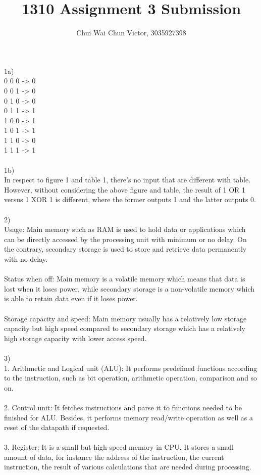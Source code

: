 \documentclass{article}
\title{1310 Assignment 3 Submission}
\author{Chui Wai Chun Victor, 3035927398}
\begin{document}
\maketitle
\noindent
1a) \\
0 0 0 -> 0\\
0 0 1 -> 0\\
0 1 0 -> 0\\
0 1 1 -> 1\\
1 0 0 -> 1\\
1 0 1 -> 1\\
1 1 0 -> 0\\
1 1 1 -> 1\\\\
1b)\\
In respect to figure 1 and table 1, there's no input that are different with table. However, without considering the above figure and table, the result of 1 OR 1 versus 1 XOR 1 is different, where the former outputs 1 and the latter outputs 0.\\
\\
2)\\
Usage: Main memory such as RAM is used to hold data or applications which can be directly accessed by the processing unit with minimum or no delay. On the contrary, secondary storage is used to store and retrieve data permanently with no delay.\\\\
Status when off: Main memory is a volatile memory which means that data is lost when it loses power, while secondary storage is a non-volatile memory which is able to retain data even if it loses power.\\\\
Storage capacity and speed: Main memory usually has a relatively low storage capacity but high speed compared to secondary storage which has a relatively high storage capacity with lower access speed.
\\
\\
3)\\
1. Arithmetic and Logical unit (ALU): It performs predefined functions according to the instruction, such as bit operation, arithmetic operation, comparison and so on.\\\\
2. Control unit: It fetches instructions and parse it to functions needed to be finished for ALU. Besides, it performs memory read/write operation as well as a reset of the datapath if requested.\\\\
3. Register: It is a small but high-speed memory in CPU. It stores a small amount of data, for instance the address of the instruction, the current instruction, the result of various calculations that are needed during processing.\\\\
\end{document}

